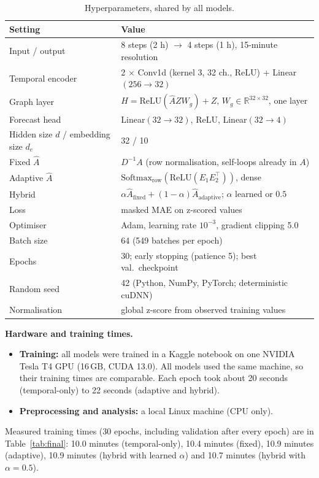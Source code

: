 \documentclass[11pt, a4paper]{article}
\begin{document}
\begin{table}[H]
\centering
\small
\begin{tabular}{@{}ll@{}}
\toprule
Setting & Value \\
\midrule
Input / output & 8 steps (2 h) $\to$ 4 steps (1 h), 15-minute resolution \\
Temporal encoder & 2 $\times$ Conv1d (kernel 3, 32 ch., ReLU) + Linear$(256 \to 32)$ \\
Graph layer & $H = \mathrm{ReLU}(\hat{A} Z W_g) + Z$, $W_g \in \mathbb{R}^{32 \times 32}$, one layer \\
Forecast head & Linear$(32 \to 32)$, ReLU, Linear$(32 \to 4)$ \\
Hidden size $d$ / embedding size $d_e$ & 32 / 10 \\
Fixed $\hat{A}$ & $D^{-1}A$ (row normalisation, self-loops already in $A$) \\
Adaptive $\hat{A}$ & $\mathrm{Softmax}_{\text{row}}(\mathrm{ReLU}(E_1 E_2^\top))$, dense \\
Hybrid & $\alpha \hat{A}_{\text{fixed}} + (1-\alpha)\hat{A}_{\text{adaptive}}$; $\alpha$ learned or $0.5$ \\
Loss & masked MAE on z-scored values \\
Optimiser & Adam, learning rate $10^{-3}$, gradient clipping 5.0 \\
Batch size & 64 (549 batches per epoch) \\
Epochs & 30; early stopping (patience 5); best val.\ checkpoint \\
Random seed & 42 (Python, NumPy, PyTorch; deterministic cuDNN) \\
Normalisation & global z-score from observed training values \\
\bottomrule
\end{tabular}
\caption{Hyperparameters, shared by all models.}
\end{table}

\textbf{Hardware and training times.}
\begin{itemize}
\item \textbf{Training:} all models were trained in a Kaggle notebook on one NVIDIA Tesla T4 GPU (16\,GB, CUDA 13.0). All models used the same machine, so their training times are comparable. Each epoch took about 20 seconds (temporal-only) to 22 seconds (adaptive and hybrid).
\item \textbf{Preprocessing and analysis:} a local Linux machine (CPU only).
\end{itemize}
Measured training times (30 epochs, including validation after every epoch) are in Table~\ref{tab:final}: 10.0 minutes (temporal-only), 10.4 minutes (fixed), 10.9 minutes (adaptive), 10.9 minutes (hybrid with learned $\alpha$) and 10.7 minutes (hybrid with $\alpha = 0.5$).
\end{document}
